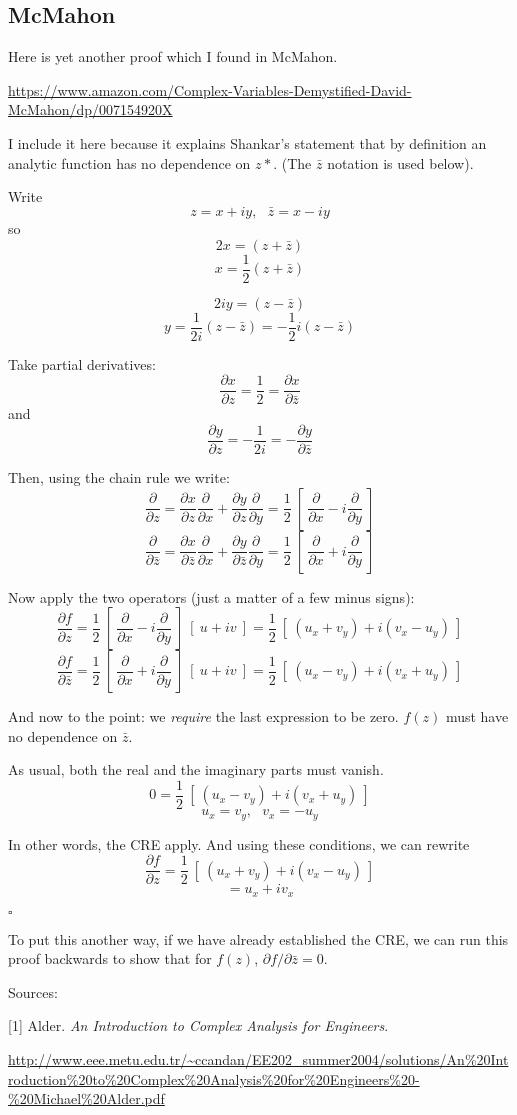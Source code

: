 \documentclass[11pt, oneside]{article}
\begin{document}
\subsection*{McMahon}
Here is yet another proof which I found in McMahon.  

\url{https://www.amazon.com/Complex-Variables-Demystified-David-McMahon/dp/007154920X}

I include it here because it explains Shankar's statement that by definition an analytic function has no dependence on $z*$.  (The $\bar{z}$ notation is used below).

Write
\[ z = x + iy , \ \ \  \bar{z} = x - iy \]
so
\[ 2x = (z + \bar{z})  \]
\[ x = \frac{1}{2} (z + \bar{z})  \]

\[ 2iy = (z - \bar{z}) \]
\[ y = \frac{1}{2i} (z - \bar{z}) = - \frac{1}{2} i (z - \bar{z})\]

Take partial derivatives:
\[ \frac{\partial x}{\partial z} = \frac{1}{2} = \frac{\partial x}{\partial \bar{z}} \]
and
\[ \frac{\partial y}{\partial z} = -\frac{1}{2i}  = -\frac{\partial y}{\partial \bar{z}} \]

Then, using the chain rule we write:
\[ \frac{\partial}{\partial z} =  \frac{\partial x}{\partial z}  \frac{\partial}{\partial x} + \frac{\partial y}{\partial z}  \frac{\partial}{\partial y} = \frac{1}{2} \ [ \ \frac{\partial}{\partial x} - i \frac{\partial}{\partial y} \ ] \]
\[ \frac{\partial}{\partial \bar{z}} =  \frac{\partial x}{\partial \bar{z}}  \frac{\partial}{\partial x} + \frac{\partial y}{\partial \bar{z}}  \frac{\partial}{\partial y} = \frac{1}{2} \ [ \ \frac{\partial}{\partial x} + i \frac{\partial}{\partial y} \ ] \]

Now apply the two operators (just a matter of a few minus signs):
\[ \frac{\partial f}{\partial z} =  \frac{1}{2} \ [ \ \frac{\partial}{\partial x} - i \frac{\partial}{\partial y} \ ]  \ [ \ u + iv \ ] = \frac{1}{2} \ [ \ (u_x + v_y) + i( v_x - u_y) \ ] \]
\[ \frac{\partial f}{\partial \bar{z}} =  \frac{1}{2} \ [ \ \frac{\partial}{\partial x} + i \frac{\partial}{\partial y} \ ]  \ [ \ u + iv \ ] = \frac{1}{2} \ [ \ (u_x - v_y) + i( v_x + u_y) \ ] \]

And now to the point:  we \emph{require} the last expression to be zero.  $f(z)$ must have no dependence on $\bar{z}$.

As usual, both the real and the imaginary parts must vanish.
\[ 0 = \frac{1}{2} \ [ \ (u_x - v_y) + i( v_x + u_y) \ ] \]
\[ u_x = v_y, \ \ \ v_x = - u_y \]

In other words, the CRE apply.  And using these conditions, we can rewrite
\[ \frac{\partial f}{\partial z} = \frac{1}{2} \ [ \ (u_x + v_y) + i( v_x - u_y) \ ] \]
\[ = u_x +  iv_x \]

$\square$

To put this another way, if we have already established the CRE, we can run this proof backwards to show that for $f(z)$, $\partial f/\partial \bar{z} = 0$.

Sources:

[1] Alder.  \emph{An Introduction to Complex Analysis for Engineers}.

\url{http://www.eee.metu.edu.tr/~ccandan/EE202_summer2004/solutions/An%20Introduction%20to%20Complex%20Analysis%20for%20Engineers%20-%20Michael%20Alder.pdf}
\end{document}
